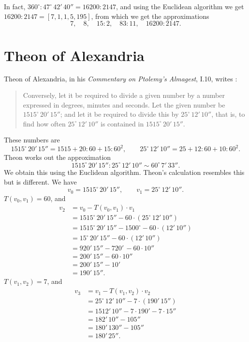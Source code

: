 \documentclass{article}
\begin{document}
In fact, $360^\circ: 47^\circ \, 42' \, 40'' = 16200:2147$, and using the Euclidean algorithm we get
$16200:2147 = [7,1,1,5,195]$, from which we get the approximations
\[
7,\quad 8, \quad 15:2,
\quad 83:11,\quad 16200:2147.
\] 




\section{Theon of Alexandria}
Theon of Alexandria, in his {\em Commentary on Ptolemy's Almagest}, I.10, writes  \cite[pp.~50--53]{LCL335}:
\begin{quote}
Conversely, let it be required to divide a given number by a number expressed in degrees, minutes and seconds. Let the given number be
$1515^\circ \, 20' \,15''$; and let it be required to divide this by $25^\circ \, 12' \, 10''$, that is, to find how often $25^\circ \, 12' \, 10''$ is contained in $1515^\circ \, 20' \, 15''$.
\end{quote}
These numbers are
\[
1515^\circ \, 20' \,15'' = 1515 + 20:60 + 15:60^2,\qquad 25^\circ \, 12' \, 10'' = 25 + 12:60 + 10:60^2.
\]
Theon works out the approximation
\[
1515^\circ \, 20' \,15'' : 25^\circ \, 12' \, 10''  \sim 60^\circ \, 7' \, 33''.
\]
We obtain this using the Euclidean algorithm. Theon's calculation resembles this but is different. 
We have
\[
v_0=1515^\circ \, 20' \,15'' ,\qquad v_1 = 25^\circ \, 12' \, 10''.
\]
$T(v_0,v_1)=60$, and 
\begin{align*}
v_2&=v_0 - T(v_0,v_1) \cdot v_1\\
&=1515^\circ \, 20' \,15'' - 60\cdot (25^\circ \, 12' \, 10'')\\
&=1515^\circ \, 20' \,15''  - 1500^\circ - 60 \cdot (12' \, 10'')\\
&=15^\circ \, 20' \, 15'' -  60 \cdot (12' \, 10'')\\
&=920' \, 15'' - 720' \, - 60 \cdot 10''\\
&=200' \, 15'' - 60 \cdot 10''\\
&=200' \, 15'' - 10'\\
&=190' \, 15''.
\end{align*}
$T(v_1,v_2) = 7$, and
\begin{align*}
v_3&=v_1-T(v_1,v_2) \cdot v_2\\
&=25^\circ \, 12' \, 10'' - 7\cdot (190' \, 15'')\\
&=1512' \, 10'' - 7\cdot 190' - 7\cdot 15''\\
&=182' \, 10'' - 105''\\
&=180' \, 130'' - 105''\\
&=180' \, 25''.
\end{align*}
\end{document}
